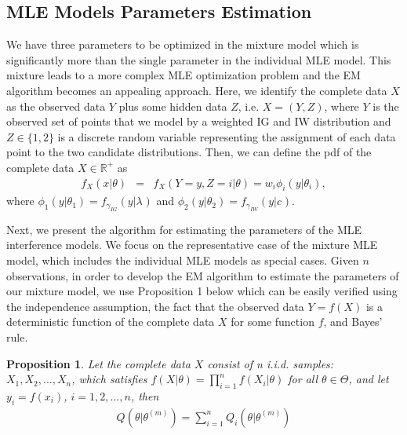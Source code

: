 \documentclass[12pt, draftclsnofoot, onecolumn]{IEEEtran}
\newtheorem{Proposition}{Proposition}
\theoremstyle{plain}
\begin{document}
\subsection{MLE Models Parameters Estimation} \label{EMalgorithmEstimation}\vspace{-.1in}
We have three parameters to be optimized in the mixture model which is significantly more than the single parameter in the individual MLE model. This mixture leads to a more complex MLE optimization problem and the EM algorithm \cite{dempster1977maximum} becomes an appealing approach.
Here, we identify the complete data $X$ as the observed data $Y$ plus some hidden data $Z$, i.e. $X=(Y,Z)$, where $Y$ is the observed set of points that we model by a weighted IG and IW distribution and $Z\in \{1,2\}$ is a discrete random variable representing the assignment of each data point to the two candidate distributions.
Then, we can define the pdf of the complete data $X \in \mathbb{R}^+$ as
\begin{eqnarray}
f_X(x|\theta)&=&f_X(Y=y,Z=i|\theta)=w_i \phi_i(y|\theta_i),\label{Pyz}
\end{eqnarray}
where $\phi_1(y|\theta_1) = f_{\gamma_{IG}}(y|{{\lambda_{}}})$ and $\phi_2(y|\theta_2) = f_{\gamma_{IW}}(y|{{c_{}}})$.

Next, we present the algorithm for estimating the parameters of the MLE interference models. We focus on the representative case of the mixture MLE model, which includes the individual MLE models as special cases.
 Given $n$ observations, in order to develop the EM algorithm to estimate the parameters of our mixture model, we use Proposition 1 below \cite{chen2010demystified} which can be {easily} verified using the independence assumption, the fact that the observed data $Y=f(X)$ is a deterministic function of the complete data $X$ for some function $f$, and Bayes' rule. \vspace{-.1in}
 \begin{Proposition}\label{Proposition1} \textnormal{\cite{chen2010demystified}}
 Let the complete data $X$ consist of n i.i.d. samples: $X_1,X_2,...,X_n$, which satisfies $f(X|\theta)=\prod_{i=1}^n f(X_i|\theta)$ for all $\theta \in \Theta$, and let $y_i=f(x_i)$, $i=1,2,...,n$, then \vspace{-.05in}
 \begin{eqnarray}
 Q(\theta|\theta^{(m)})=\sum_{i=1}^n Q_i(\theta|\theta^{(m)})
 \end{eqnarray}
 \end{Proposition} 
 
\end{document}

